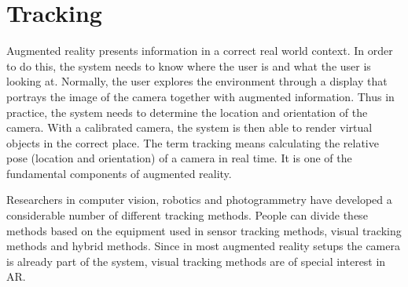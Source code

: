 \section{Tracking}


Augmented reality presents information in a correct real world context. In order to do this, the system needs to know where the user is and what the user is looking at. Normally, the user explores the environment through a display that portrays the image of the camera together with augmented information. Thus in practice, the system needs to determine the location and orientation of the camera. With a calibrated camera, the system is then able to render virtual objects in the correct place. The term tracking means calculating the relative pose (location and orientation) of a camera in real time. It is one of the fundamental components of augmented reality.

Researchers in computer vision, robotics and photogrammetry have developed a considerable number of different tracking methods. People can divide these methods based on the equipment used in sensor tracking methods, visual tracking methods and hybrid methods. Since in most augmented reality setups the camera is already part of the system, visual tracking methods are of special interest in AR.


